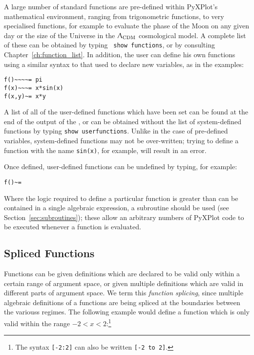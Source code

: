A large number of standard functions are pre-defined within PyXPlot's
mathematical environment, ranging from trigonometric functions, to very
specialised functions, for example to evaluate the phase of the Moon on any
given day or the size of the Universe in the $\Uplambda_\mathrm{CDM}$
cosmological model. A complete list of these can be obtained by typing {\tt
show functions}, or by consulting
Chapter~\ref{ch:function_list}. In addition, the user can define his own
functions using a similar syntax to that used to declare new variables, as in
the examples:

\begin{verbatim}
f()~~~~= pi
f(x)~~~= x*sin(x)
f(x,y)~= x*y
\end{verbatim}

A list of all of the user-defined functions which have been set can be found at
the end of the output of the , or can be obtained
without the list of system-defined functions by typing {\tt show
userfunctions}. Unlike in the case of pre-defined
variables, system-defined functions may not be over-written; trying to define a
function with the name {\tt sin(x)}, for example, will result in an error.

Once defined, user-defined functions can be undefined by typing, for example:

\begin{verbatim}
f()~=
\end{verbatim}

Where the logic required to define a particular function is greater than can be
contained in a single algebraic expression, a subroutine should be used (see
Section~\ref{sec:subroutines}); these allow an arbitrary numbers of PyXPlot
code to be executed whenever a function is evaluated.

\subsection{Spliced Functions}

Functions can be given definitions which are declared to be valid only within a
certain range of argument space, or given multiple definitions which are valid
in different parts of argument space. We term this {\it function splicing},
since multiple algebraic definitions of a functions are being spliced at the
boundaries between the variouss regimes.  The following example would define a
function which is only valid within the range $-2<x<2$:\footnote{The syntax
{\tt [-2:2]} can also be written {\tt [-2 to 2]}.}

